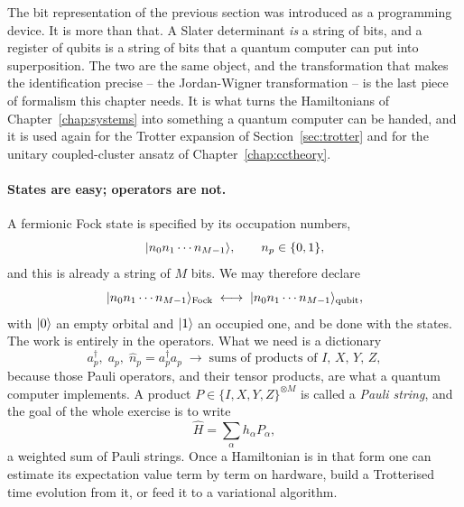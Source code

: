 The bit representation of the previous section was introduced as a
programming device.  It is more than that.  A Slater determinant \emph{is} a
string of bits, and a register of qubits is a string of bits that a quantum
computer can put into superposition.  The two are the same object, and the
transformation that makes the identification precise -- the Jordan-Wigner
transformation -- is the last piece of formalism this chapter needs.  It is
what turns the Hamiltonians of Chapter~\ref{chap:systems} into something a
quantum computer can be handed, and it is used again for the Trotter
expansion of Section~\ref{sec:trotter} and for the unitary coupled-cluster
ansatz of Chapter~\ref{chap:cctheory}.

\paragraph{States are easy; operators are not.}
A fermionic Fock state is specified by its occupation numbers,
\begin{equation}
  \vert n_0 n_1 \cdots n_{M-1} \rangle,
  \qquad n_p\in\{0,1\},
  \label{eq:3-focknumbers}
\end{equation}
and this is already a string of $M$ bits.  We may therefore declare
\begin{equation}
  \vert n_0 n_1\cdots n_{M-1} \rangle_{\mathrm{Fock}}
   \;\longleftrightarrow\;
  \vert n_0 n_1\cdots n_{M-1} \rangle_{\mathrm{qubit}} ,
  \label{eq:3-fockqubit}
\end{equation}
with $\vert 0 \rangle$ an empty orbital and $\vert 1 \rangle$ an occupied one, and be done
with the states.  The work is entirely in the operators.  What we need is a
dictionary
\begin{equation}
  a_p^{\dagger},\; a_p,\; \hat{n}_p=a_p^{\dagger}a_p
  \;\longrightarrow\;
  \text{sums of products of }I,\,X,\,Y,\,Z ,
  \label{eq:3-operatordictionary}
\end{equation}
because those Pauli operators, and their tensor products, are what a quantum
computer implements.  A product $P\in\{I,X,Y,Z\}^{\otimes M}$ is called a
\emph{Pauli string}, and the goal of the whole exercise is to write
\begin{equation}
  \hat{H} = \sum_{\alpha} h_{\alpha}P_{\alpha} ,
  \label{eq:3-paulisum}
\end{equation}
a weighted sum of Pauli strings.  Once a Hamiltonian is in that form one can
estimate its expectation value term by term on hardware, build a Trotterised
time evolution from it, or feed it to a variational algorithm.

